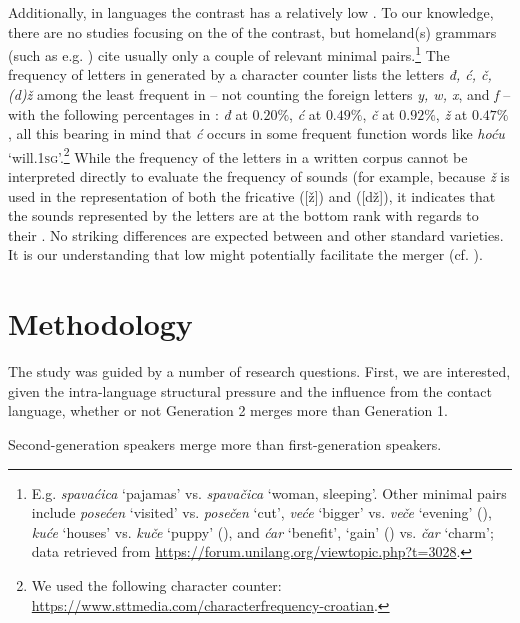 \documentclass[output=paper,modfonts,newtxmath,hidelinks,]{langscibook}
\begin{document}
Additionally, in  languages the contrast has a relatively low . To our knowledge, there are no studies focusing on the  of the contrast, but homeland(s) grammars (such as e.g. \citealt{Brozovic1991}) cite usually only a couple of relevant minimal pairs.\footnote{E.g. \textit{spavaćica} `pajamas' vs. \textit{spavačica} `woman, sleeping'. Other minimal pairs include \textit{posećen} `visited' vs. \textit{posečen} `cut', \textit{veće} `bigger' vs. \textit{veče} `evening' (), \textit{kuće} `houses' vs. \textit{kuče} `puppy' (), and \textit{ćar} `benefit', `gain' () vs. \textit{čar} `charm'; data retrieved from \url{https://forum.unilang.org/viewtopic.php?t=3028}.} The frequency of letters in  generated by a character counter lists the letters \textit{đ, ć, č, (d)ž} among the least frequent in  – not counting the foreign letters \textit{y, w, x}, and \textit{f} – with the following percentages in : \textit{đ} at $0.20\%$, \textit{ć} at $0.49\%$, \textit{č} at $0.92\%$, \textit{ž} at $0.47\%$, all this bearing in mind that \textit{ć} occurs in some frequent function words like \textit{hoću} `will.\textsc{1sg}’.\footnote{We used the following character counter: \url{https://www.sttmedia.com/characterfrequency-croatian}.} While the frequency of the letters in a written corpus cannot be interpreted directly to evaluate the frequency of sounds (for example, because \textit{ž} is used in the representation of both the fricative ([ž]) and  ([dž]), it indicates that the sounds represented by the letters are at the bottom rank with regards to their . No striking differences are expected between  and other standard varieties. It is our understanding that low  might potentially facilitate the merger (cf. \citealt{Wedel-etal2013}).


\section{Methodology}\label{sec:mihajlovic:4}

The study was guided by a number of research questions. First, we are interested, given the intra-language structural pressure and the influence from the contact language, whether or not Generation 2 merges more than Generation 1.


\begin{exe}
  Second-generation speakers merge more than first-generation   speakers.
\end{exe}
\end{document}
